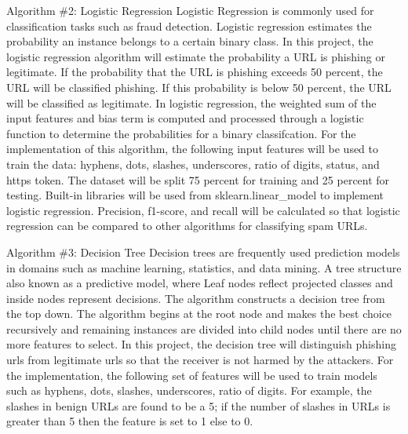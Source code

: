 \documentclass[conference]{IEEEtran}
\begin{document}
Algorithm \#2: Logistic Regression
Logistic Regression is commonly used for classification tasks such as fraud detection. Logistic regression estimates the probability an instance belongs to a certain binary class. In this project, the logistic regression algorithm will estimate the probability a URL is phishing or legitimate. If the probability that the URL is phishing exceeds 50 percent, the URL will be classified phishing. If this probability is below 50 percent, the URL will be classified as legitimate. In logistic regression, the weighted sum of the input features and bias term is computed and processed through a logistic function to determine the probabilities for a binary classifcation. For the implementation of this algorithm, the following input features will be used to train the data: hyphens, dots, slashes, underscores, ratio of digits, status, and https token. The dataset will be split 75 percent for training and 25 percent for testing. Built-in libraries will be used from sklearn.linear_model to implement logistic regression. Precision, f1-score, and recall will be calculated so that logistic regression can be compared to other algorithms for classifying spam URLs. 

Algorithm \#3: Decision Tree
Decision trees are frequently used prediction models in domains such as machine learning, statistics, and data mining. A tree structure also known as a predictive model, where Leaf nodes reflect projected classes and inside nodes represent decisions. The algorithm constructs a decision tree from the top down. The algorithm begins at the root node and makes the best choice recursively and remaining instances are divided into child nodes until there are no more features to select. In this project, the decision tree will distinguish phishing urls from legitimate urls so that the receiver is not harmed by the attackers.  For the implementation, the following set of features will be used to train models such as  hyphens, dots, slashes, underscores, ratio of digits. For example, the slashes in benign URLs are found to be a 5; if the number of slashes in URLs is greater than 5 then the feature is set to 1 else to 0.
\end{document}
